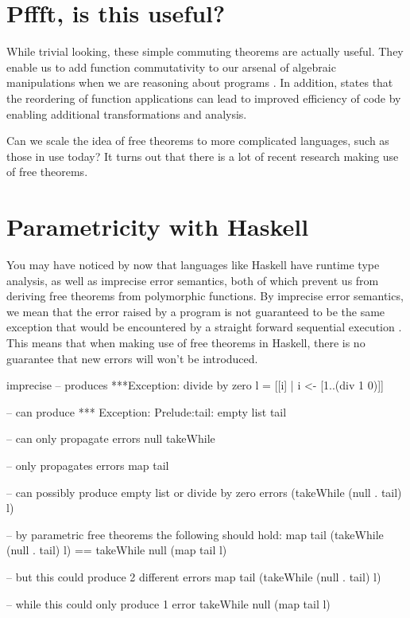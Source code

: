 \section{Pffft, is this useful?}
While trivial looking, these simple commuting theorems are actually useful. They enable us to add function commutativity to our arsenal of algebraic manipulations when we are reasoning about programs \cite{theoremsForFree}. In addition, \cite{impreciseSemantics} states that the reordering of function applications can lead to improved efficiency of code by enabling additional transformations and analysis.

Can we scale the idea of free theorems to more complicated languages, such as those in use today? It turns out that there is a lot of recent research making use of free theorems.

\section{Parametricity with Haskell}
You may have noticed by now that languages like Haskell have runtime type analysis, as well as imprecise error semantics, both of which prevent us from deriving free theorems from polymorphic functions. By imprecise error semantics, we mean that the error raised by a program is not guaranteed to be the same exception that would be encountered by a straight forward sequential execution \cite{jonesSemantics}. This means that when making use of free theorems in Haskell, there is no guarantee that new errors will won't be introduced.

\begin{SaveVerbatim}{imprecise}
-- produces ***Exception: divide by zero
l = [[i] | i <- [1..(div 1 0)]]

-- can produce *** Exception: Prelude:tail: empty list
tail

-- can only propagate errors
null
takeWhile

-- only propagates errors
map tail

-- can possibly produce empty list or divide by zero errors
(takeWhile (null . tail) l)

-- by parametric free theorems the following should hold:
map tail (takeWhile (null . tail) l) == 
takeWhile null (map tail l)

-- but this could produce 2 different errors
map tail (takeWhile (null . tail) l)

-- while this could only produce 1 error
takeWhile null (map tail l)
\end{SaveVerbatim}


